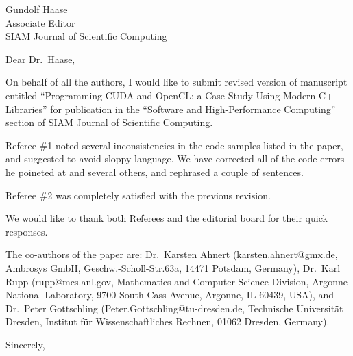 \documentclass[a4paper,11pt]{letter}
\begin{document}
\begin{letter}{
    Gundolf Haase\\
    Associate Editor\\
    SIAM Journal of Scientific Computing
    }
\opening{Dear Dr.~Haase,}

On behalf of all the authors, I would like to submit revised version of
manuscript entitled ``Programming CUDA and OpenCL: a Case Study Using Modern
C++ Libraries'' for publication in the ``Software and High-Performance
Computing'' section of SIAM Journal of Scientific Computing.

Referee \#1 noted several inconsistencies in the code samples listed in the
paper, and suggested to avoid sloppy language. We have corrected all of the
code errors he poineted at and several others, and rephrased a couple of
sentences.

Referee \#2 was completely satisfied with the previous revision.

We would like to thank both Referees and the editorial board for their quick
responses.

The co-authors of the paper are: Dr.~Karsten Ahnert (karsten.ahnert@gmx.de,
Ambrosys GmbH, Geschw.-Scholl-Str.63a, 14471 Potsdam, Germany), Dr.~Karl Rupp
(rupp@mcs.anl.gov, Mathematics and Computer Science Division, Argonne National
Laboratory, 9700 South Cass Avenue, Argonne, IL 60439, USA), and Dr.~Peter
Gottschling (Peter.Gottschling@tu-dresden.de, Technische Universit\"at Dresden,
Institut f\"ur Wissenschaftliches Rechnen, 01062 Dresden, Germany).

\closing{Sincerely,}

\end{letter}
\end{document}
